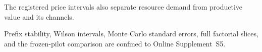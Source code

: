 The registered price intervals also separate resource demand from productive
value and its channels.
\begin{table}[htbp]
\centering
\scriptsize
\resizebox{\linewidth}{!}{}
\caption{Across-trial mean arc elasticities and channel contributions; every
entry is dimensionless.  Exact \(\mathtt{Rational\{BigInt\}}\) observations
are rounded to five decimal places for display.  Every arc is defined in all
1,024 trials, so no undefined elasticity is imputed as zero.  The two channel
contributions add exactly to productive-value elasticity before rendering.}
\label{tab:randomized-price-elasticities}
\end{table}
Prefix stability, Wilson intervals, Monte Carlo standard errors, full
factorial slices, and the frozen-pilot comparison are confined to Online
Supplement~S5.
